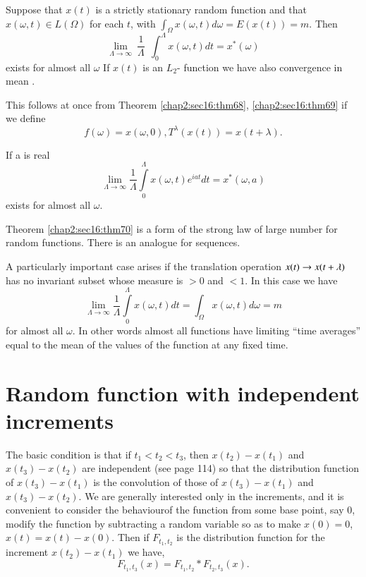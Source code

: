 \begin{theorem}\label{chap2:sec16:thm70}%
  Suppose that $x(t)$ is a strictly stationary random function and that
  $x(\omega, t) \in L (\Omega)$ for each $t$, with 
  $\int_\Omega x (\omega, t) d \omega = E (x(t)) = m$. Then
  $$
  \lim\limits_{\Lambda  \rightarrow \infty} ~ \frac {1}{\Lambda} ~~
  \int^\Lambda_0 x (\omega, t) dt = x^* (\omega) 
  $$ 
  exists for almost all $\omega$ If $x(t)$ is an $L_2$- function we have
  also convergence in mean . 
  
  This follows  at once from Theorem
  \ref{chap2:sec16:thm68}, \ref{chap2:sec16:thm69} if we define 
  $$
  f(\omega)=x(\omega,0),T^\lambda(x(t))=x(t+\lambda).
  $$
\end{theorem}  

\begin{coro*}
  If a is real
  $$
  \lim\limits_{\Lambda\rightarrow \infty}
  \frac{1}{\Lambda}\int\limits^\Lambda_0x(\omega, t)e^{iat} dt = x^* (\omega, a)
  $$
  exists for almost all $\omega$.
\end{coro*}

Theorem \ref{chap2:sec16:thm70} is a form of the strong law of large
number for random functions. There is an analogue for sequences.  

A particularly important case  arises if the translation operation
$x(t)\break \rightarrow x (t+\lambda)$ has no invariant subset whose
measure  is $>$0 and $<1$. In this case we have 
$$
\lim\limits_{\Lambda \rightarrow \infty}
\frac{1}{\Lambda}\int\limits^\Lambda_0 x(\omega, t) dt = \int_\Omega x (\omega
, t)d \omega =m 
$$ 
for almost all $\omega$. In other words almost all functions have
limiting ``time averages'' equal to the mean of the values of the
function  at any fixed time.  

\section{Random function with independent increments}\label{chap2:sec17}

The basic condition is that if $t_1<t_2<t_3$, then $x(t_2)-x(t_1)$ and
$x(t_3) - x(t_2)$ are independent (see page 114) so that the distribution
function of $x(t_3)-x(t_1) $ is the convolution of those of
$x(t_3)-x(t_1)$ and $x(t_3)-x(t_2)$. We are generally interested only in
the increments, and it is convenient to consider the  
behaviour\pageoriginale of the function from some base point, say 0, modify the
function by subtracting a random variable so as to make
$x(0)=0$, $x(t)=x(t)-x(0)$. Then if $F_{t_1,t_2}$ is the distribution
function for the increment $x(t_2)-x(t_1)$ we have, 
$$
F_{t_1,t_3}(x)=F_{t_1,t_2} * F_{t_2,t_3}(x).  
$$

